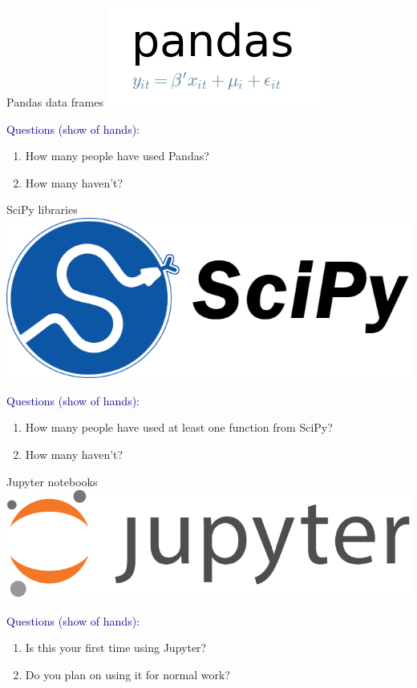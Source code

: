 \documentclass[aspectratio=169]{beamer}
\begin{document}
\begin{frame}{Pandas data frames}
\vspace{0.25 cm}
\hfill \includegraphics[height=1.3 cm]{pandas-logo.png}

\vspace{-1.3 cm}

\vfill
\small
\textcolor{darkblue}{Questions (show of hands):}
\vspace{-0.2 cm}
\begin{enumerate}\setlength{\itemsep}{-0.1 cm}
\item How many people have used Pandas?
\item How many haven't?
\end{enumerate}
\end{frame}

\begin{frame}{SciPy libraries}
\vspace{0.25 cm}
\hfill \includegraphics[height=1 cm]{scipy-logo.png}

\vspace{-1 cm}

\vfill
\small
\textcolor{darkblue}{Questions (show of hands):}
\vspace{-0.2 cm}
\begin{enumerate}\setlength{\itemsep}{-0.1 cm}
\item How many people have used at least one function from SciPy?
\item How many haven't?
\end{enumerate}
\end{frame}

\begin{frame}{Jupyter notebooks}
\vspace{0.25 cm}
\hfill \includegraphics[height=0.8 cm]{jupyter-logo.png}

\vspace{-0.8 cm}

\vfill
\small
\textcolor{darkblue}{Questions (show of hands):}
\vspace{-0.2 cm}
\begin{enumerate}\setlength{\itemsep}{-0.1 cm}
\item Is this your first time using Jupyter?
\item Do you plan on using it for normal work?
\end{enumerate}
\end{frame}
\end{document}
